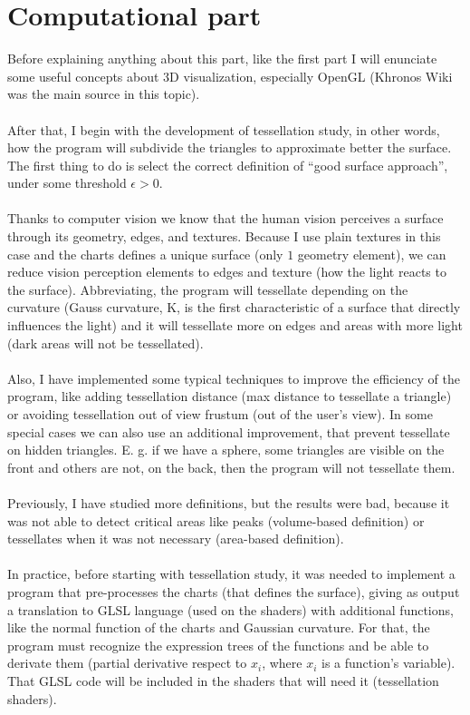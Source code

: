 \section*{Computational part}
Before explaining anything about this part, like the first part I will enunciate some useful concepts about $3$D visualization, especially OpenGL (Khronos Wiki \cite{KhronosWiki} was the main source in this topic).\\
\\After that, I begin with the development of tessellation study, in other words, how the program will subdivide the triangles to approximate better the surface. The first thing to do is select the correct definition of ``good surface approach'', under some threshold $\epsilon>0$.\\
\\Thanks to computer vision we know that the human vision perceives a surface through its geometry, edges, and textures. Because I use plain textures in this case and the charts defines a unique surface (only $1$ geometry element), we can reduce vision perception elements to edges and texture (how the light reacts to the surface). Abbreviating, the program will tessellate depending on the curvature (Gauss curvature, K, is the first characteristic of a surface that directly influences the light) and it will tessellate more on edges and areas with more light (dark areas will not be tessellated).\\
\\Also, I have implemented some typical techniques to improve the efficiency of the program, like adding tessellation distance (max distance to tessellate a triangle) or avoiding tessellation out of view frustum (out of the user's view). In some special cases we can also use an additional improvement, that prevent tessellate on hidden triangles. E. g. if we have a sphere, some triangles are visible on the front and others are not, on the back, then the program will not tessellate them.\\
\\Previously, I have studied more definitions, but the results were bad, because it was not able to detect critical areas like peaks (volume-based definition) or tessellates when it was not necessary (area-based definition).\\
\\In practice, before starting with tessellation study, it was needed to implement a program that pre-processes the charts (that defines the surface), giving as output a translation to GLSL language (used on the shaders) with additional functions, like the normal function of the charts and Gaussian curvature. For that, the program must recognize the expression trees of the functions and be able to derivate them (partial derivative respect to $x_i$, where $x_i$ is a function's variable). That GLSL code will be included in the shaders that will need it (tessellation shaders).\\
